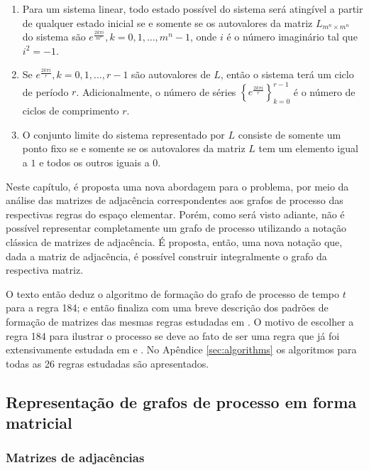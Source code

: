 \documentclass[12pt,a4paper]{article}
\begin{document}
\begin{enumerate}
\item Para um sistema linear, todo estado possível do sistema será
atingível a partir de qualquer estado inicial se e somente se os autovalores
da matriz $L_{m^n \times m^n}$ do sistema são
$e^{\frac{2k\pi i}{m^n}},k=0,1,\ldots,m^n-1$, onde $i$ é o número
imaginário tal que $i^2=-1$.

\item Se $e^{\frac{2k\pi i}{r}},k=0,1,\ldots,r-1$ são autovalores de $L$,
então o sistema terá um ciclo de período $r$. Adicionalmente,
o número de séries $\left\{e^{\frac{2k\pi i}{r}}\right\}^{r-1}_{k=0}$
é o número de ciclos de comprimento $r$.

\item O conjunto limite do sistema representado por $L$ consiste de somente um
ponto fixo se e somente se os autovalores da matriz $L$
tem um elemento igual a $1$ e todos os outros iguais a $0$.
\end{enumerate}

Neste capítulo, é proposta uma nova abordagem para o problema, por meio da
análise das matrizes de adjacência correspondentes aos grafos de processo
das respectivas regras do espaço elementar. Porém, como será visto adiante,
não é possível representar completamente um grafo de processo utilizando a
notação clássica de matrizes de adjacência. É proposta, então, uma
nova notação que, dada a matriz de adjacência, é possível construir
integralmente o grafo da respectiva matriz.

O texto então deduz o algoritmo de formação do grafo de processo
de tempo $t$ para a regra 184; e então finaliza com uma breve
descrição dos padrões de formação de matrizes das mesmas regras
estudadas em . O motivo de escolher
a regra 184 para ilustrar o processo se deve ao fato de ser
uma regra que já foi extensivamente estudada em 
e . No Apêndice \ref{sec:algorithms} os algoritmos
para todas as 26 regras estudadas são apresentados.

\subsection{Representação de grafos de processo em forma matricial}

\subsubsection{Matrizes de adjacências}
\end{document}
